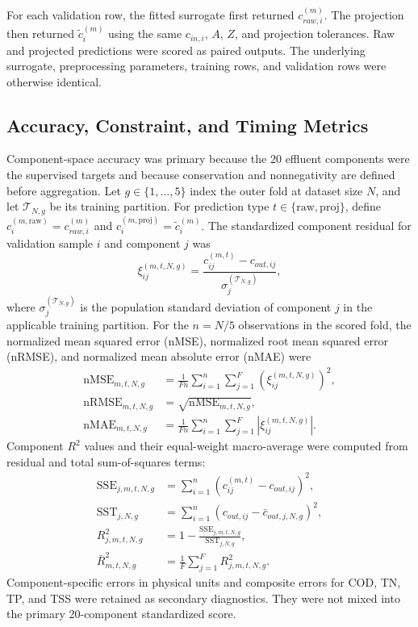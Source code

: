 \documentclass[12pt, twoside]{book}
\begin{document}
For each validation row, the fitted surrogate first returned \(c_{raw,i}^{(m)}\). The projection then returned
\(\tilde c_i^{(m)}\) using the same \(c_{in,i}\), \(A\), \(Z\), and projection tolerances. Raw and projected
predictions were scored as paired outputs. The underlying surrogate, preprocessing parameters, training rows,
and validation rows were otherwise identical.

\subsection{Accuracy, Constraint, and Timing Metrics}

Component-space accuracy was primary because the 20 effluent components were the supervised targets and because
conservation and nonnegativity are defined before aggregation. Let \(g\in\{1,\ldots,5\}\) index the outer fold
at dataset size \(N\), and let \(\mathcal{T}_{N,g}\) be its training partition. For prediction type
\(t\in\{\mathrm{raw},\mathrm{proj}\}\), define \(c_i^{(m,\mathrm{raw})}=c_{raw,i}^{(m)}\) and
\(c_i^{(m,\mathrm{proj})}=\tilde c_i^{(m)}\). The standardized component residual for validation sample \(i\)
and component \(j\) was
\begin{equation}
\label{eq:ch2_standardized_residual}
\xi_{ij}^{(m,t,N,g)}
=\frac{c_{ij}^{(m,t)}-c_{out,ij}}
{\sigma_j^{(\mathcal{T}_{N,g})}},
\end{equation}
where \(\sigma_j^{(\mathcal{T}_{N,g})}\) is the population standard deviation of component \(j\) in the
applicable training partition. For the \(n=N/5\) observations in the scored fold, the normalized mean squared
error (nMSE), normalized root mean squared error (nRMSE), and normalized mean absolute error (nMAE) were
\begin{align}
\mathrm{nMSE}_{m,t,N,g}
&=\frac{1}{Fn}\sum_{i=1}^{n}\sum_{j=1}^{F}
\left(\xi_{ij}^{(m,t,N,g)}\right)^2, \nonumber\\
\mathrm{nRMSE}_{m,t,N,g}
&=\sqrt{\mathrm{nMSE}_{m,t,N,g}}, \label{eq:ch2_normalized_metrics}\\
\mathrm{nMAE}_{m,t,N,g}
&=\frac{1}{Fn}\sum_{i=1}^{n}\sum_{j=1}^{F}
\left|\xi_{ij}^{(m,t,N,g)}\right|. \nonumber
\end{align}
Component \(R^2\) values and their equal-weight macro-average were computed from residual and total
sum-of-squares terms:
\begin{equation}
\label{eq:ch2_coefficient_determination}
\begin{aligned}
\mathrm{SSE}_{j,m,t,N,g}
&=\sum_{i=1}^{n}\left(c_{ij}^{(m,t)}-c_{out,ij}\right)^2,\\
\mathrm{SST}_{j,N,g}
&=\sum_{i=1}^{n}\left(c_{out,ij}-\bar c_{out,j,N,g}\right)^2,\\
R_{j,m,t,N,g}^{2}
&=1-\frac{\mathrm{SSE}_{j,m,t,N,g}}{\mathrm{SST}_{j,N,g}},\\
\bar R_{m,t,N,g}^{2}
&=\frac{1}{F}\sum_{j=1}^{F}R_{j,m,t,N,g}^{2}.
\end{aligned}
\end{equation}
Component-specific errors in physical units and composite errors for COD, TN, TP, and TSS were retained as
secondary diagnostics. They were not mixed into the primary 20-component standardized score.
\end{document}
